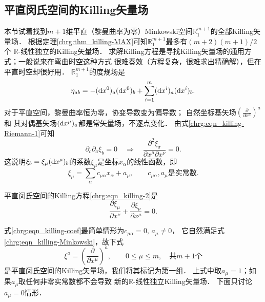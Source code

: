 
\subsection{平直闵氏空间的Killing矢量场}\label{chrg:sec_killing-Minkowski}
本节试着找到$m+1$维平直（黎曼曲率为零）Minkowski空间$\mathbb{R}^{m+1}_1$的全部Killing矢量场．
根据定理\ref{chrg:thm_killing-MAX}可知$\mathbb{R}^{m+1}_1$最多有$(m+2)(m+1)/2$个
$\mathbb{R}$-线性独立的Killing矢量场．
求解Killing方程是寻找Killing矢量场的通用方式；一般说来在弯曲时空这种方式
很难奏效（方程复杂，很难求出精确解），但在平直时空却很好用．
$\mathbb{R}^{m+1}_1$的度规场是
\begin{equation}
    \eta_{ab} = -({\rm d}x^0)_a ({\rm d}x^0)_b+
    \sum_{i=1}^{m} ({\rm d}x^i)_a({\rm d}x^i)_b .
\end{equation}
对于平直空间，黎曼曲率恒为零，协变导数变为偏导数；
自然坐标基矢场$(\frac{\partial}{\partial x^\mu})^a$和
其对偶基矢场$({\rm d}x^\mu)_a$都是常矢量场，不逐点变化．
由式\eqref{chrg:eqn_killing-Riemann-1}可知
\begin{equation}
    {\partial_c}{\partial_a}{\xi_b} = 0 \quad \Rightarrow \quad
    \frac{\partial^2 \xi_\sigma}{\partial x^\mu \partial x^\nu} = 0.
\end{equation}
这说明$\xi_b = \xi_\mu ({\rm d}x^\mu)_b$的系数$\xi_\mu$是坐标$x_\alpha$的线性函数，即
\begin{equation}\label{chrg:eqn_killing-coef}
    \xi_\mu = \sum_{\alpha}c_{\mu \alpha}x_\alpha + a_\mu,\qquad
    c_{\mu \alpha}, a_\mu \text{是实常数}.
\end{equation}


平直闵氏空间的Killing方程\eqref{chrg:eqn_killing-2}是
\begin{equation}\label{chrg:eqn_killing-Minkowski}
    \frac{\partial \xi_\mu}{\partial x^\nu}+\frac{\partial \xi_\nu}{\partial x^\mu} =0 .
\end{equation}

式\eqref{chrg:eqn_killing-coef}最简单情形为$c_{\mu \alpha}=0,\, a_\mu \neq 0$，
它自然满足式\eqref{chrg:eqn_killing-Minkowski}，故下式
\begin{equation}\label{chrg:eqn_Killing-Minkowski-1}
    \xi^a= \left(\frac{\partial}{\partial x^\mu }\right)^a ,
    \qquad    0\leqslant \mu \leqslant m,\quad \text{共$m+1$个}
\end{equation}
是平直闵氏空间的Killing矢量场，我们将其标记为第一组．
上式中取$a_\mu=1$；如果$a_\mu$取任何非零实常数都不会导致
新的$\mathbb{R}$-线性独立Killing矢量场．
下面只讨论$a_\mu=0$情形．



